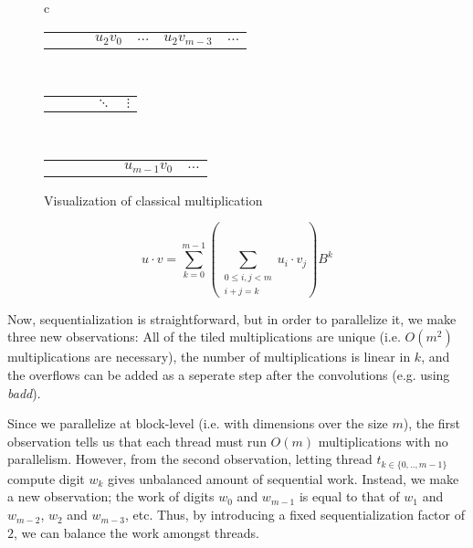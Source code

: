 {\begin{minipage}{0.5\textwidth}
\begin{figure}[H]
\begin{tabular}{c}
    \begin{tabular}{C{0cm}C{0.8cm}C{0.8cm}C{0.8cm}C{0.5cm}C{0.8cm}C{0cm}}
       & & & $u_2v_0$ & $\ldots$ & $u_2v_{m-3}$ & $\ldots$
    \end{tabular}\\[-0.6ex]
    \begin{tabular}{C{0.8cm}C{0.8cm}C{0.8cm}C{0.5cm}C{0.8cm}}
       & & & $\ddots$ & $\vdots$
    \end{tabular}\\[-0.6ex]
    \begin{tabular}{C{0cm}C{0.8cm}C{0.8cm}C{0.8cm}C{0.5cm}C{0.8cm}C{0cm}}
       & & & & & $u_{m-1}v_0$ & $\ldots$
    \end{tabular}
  \end{tabular}
  \caption{\footnotesize Visualization of classical multiplication}
  \label{fig:tiledmult}
  \end{figure}
\end{minipage}
\begin{minipage}{0.49\textwidth}
    \centering
\begin{equation}
\label{eq:clasmul}
u \cdot v = \sum_{k=0}^{m-1} \left( \sum_{\substack{0\leq i,j < m\\i+j=k}}u_i\cdot v_j \right)B^{k}
\end{equation}
\end{minipage}
}

Now, sequentialization is straightforward, but in order to parallelize it, we
make three new observations: All of the tiled multiplications are unique
(i.e. $O(m^2)$ multiplications are necessary), the number of multiplications is
linear in $k$, and the overflows can be added as a seperate step after the
convolutions (e.g. using \textit{badd}).

Since we parallelize at block-level (i.e. with dimensions over the size $m$),
the first observation tells us that each thread must run $O(m)$ multiplications
with no parallelism. However, from the second observation, letting thread
$t_{k\in\{0,..,m-1\}}$ compute digit $w_k$ gives unbalanced amount of sequential
work. Instead, we make a new observation; the work of digits $w_0$ and $w_{m-1}$
is equal to that of $w_1$ and $w_{m-2}$, $w_2$ and $w_{m-3}$, etc. Thus, by
introducing a fixed sequentialization factor of $2$, we can balance the work
amongst threads.


